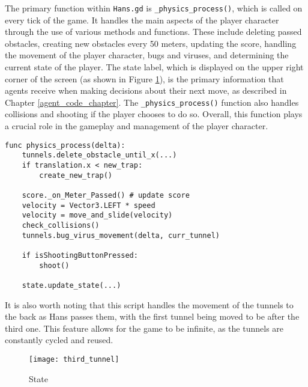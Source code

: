 The primary function within \texttt{Hans.gd} is \texttt{\_physics\_process()}, which is called on every tick of the game. It handles the main aspects of the player character through the use of various methods and functions. These include deleting passed obstacles, creating new obstacles every 50 meters, updating the score, handling the movement of the player character, bugs and viruses, and determining the current state of the player. The state label, which is displayed on the upper right corner of the screen (as shown in Figure \ref{fig:third_tunnel}), is the primary information that agents receive when making decisions about their next move, as described in Chapter \ref{agent_code_chapter}. The \texttt{\_physics\_process()} function also handles collisions and shooting if the player chooses to do so. Overall, this function plays a crucial role in the gameplay and management of the player character.

\begin{center}
\hrulefill
\begin{lstlisting}
func physics_process(delta):
    tunnels.delete_obstacle_until_x(...)
    if translation.x < new_trap:
        create_new_trap()
        
    score._on_Meter_Passed() # update score
    velocity = Vector3.LEFT * speed
    velocity = move_and_slide(velocity)
    check_collisions()
    tunnels.bug_virus_movement(delta, curr_tunnel)
    
    if isShootingButtonPressed:
        shoot()
        
    state.update_state(...)
\end{lstlisting}
\hrulefill
\end{center}

It is also worth noting that this script handles the movement of the tunnels to the back as Hans passes them, with the first tunnel being moved to be after the third one. This feature allows for the game to be infinite, as the tunnels are constantly cycled and reused.

\begin{figure}[h]
    \centering
    \texttt{[image: third\_tunnel]}
    \caption{State}
    \label{fig:third_tunnel}
\end{figure}

